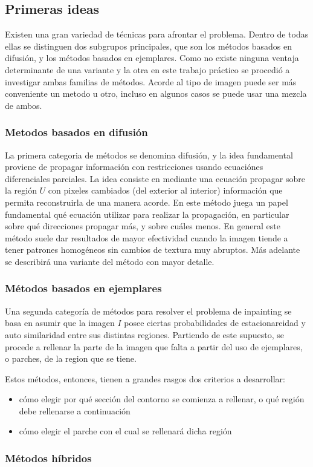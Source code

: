 \documentclass[assd_tpf_main.tex]{subfiles}
\begin{document}
\subsection{Primeras ideas}
Existen una gran variedad de técnicas para afrontar el problema. Dentro de todas ellas se distinguen dos subgrupos principales, que son los m\'etodos basados en difusión, y los métodos basados en ejemplares. Como no existe ninguna ventaja determinante de una variante y la otra en este trabajo práctico se procedió a investigar ambas familias de métodos. Acorde al tipo de imagen puede ser más conveniente un metodo u otro, incluso en algunos casos se puede usar una mezcla de ambos.

\subsubsection{Metodos basados en difusión}
La primera categoria de métodos se denomina difusión, y la idea fundamental proviene de propagar información con restricciones usando ecuaciónes diferenciales parciales. La idea consiste en mediante una ecuación propagar sobre la región $U$ con pixeles cambiados (del exterior al interior) información que permita reconstruirla de una manera acorde.
En este método juega un papel fundamental qu\'e ecuación utilizar para realizar la propagación, en particular sobre qu\'e direcciones propagar más, y sobre cu\'ales menos. En general este m\'etodo suele dar resultados de mayor efectividad cuando la imagen tiende a tener patrones homog\'eneos sin cambios de textura muy abruptos.  Más adelante se describirá una variante del método con mayor detalle.

\subsubsection{Métodos basados en ejemplares}

Una segunda categor\'ia de m\'etodos para resolver el problema de inpainting se basa en 
asumir que la imagen $I$ posee ciertas probabilidades de estacionareidad y auto similaridad 
entre sus distintas regiones. Partiendo de este supuesto, se procede a rellenar la parte
de la imagen que falta a partir del uso de ejemplares, o parches, de la region que se tiene.

Estos m\'etodos, entonces, tienen a grandes rasgos dos criterios a desarrollar:
\begin{itemize}
	\item c\'omo elegir por qu\'e secci\'on del contorno se comienza a rellenar, o qu\'e
	regi\'on debe rellenarse a continuaci\'on
	\item c\'omo elegir el parche con el cual se rellenar\'a dicha regi\'on
\end{itemize}




\subsubsection{M\'etodos h\'ibridos}
\end{document}
